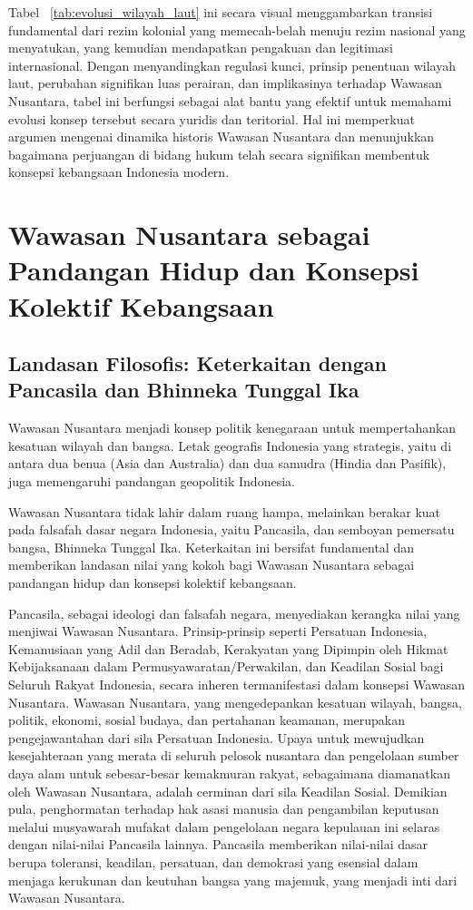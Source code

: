 \documentclass[12pt, a4paper]{article}
\begin{document}
Tabel \figurename~\ref{tab:evolusi_wilayah_laut} ini secara visual menggambarkan transisi fundamental dari rezim kolonial yang memecah-belah menuju rezim nasional yang menyatukan, yang kemudian mendapatkan pengakuan dan legitimasi internasional. Dengan menyandingkan regulasi kunci, prinsip penentuan wilayah laut, perubahan signifikan luas perairan, dan implikasinya terhadap Wawasan Nusantara, tabel ini berfungsi sebagai alat bantu yang efektif untuk memahami evolusi konsep tersebut secara yuridis dan teritorial. Hal ini memperkuat argumen mengenai dinamika historis Wawasan Nusantara dan menunjukkan bagaimana perjuangan di bidang hukum telah secara signifikan membentuk konsepsi kebangsaan Indonesia modern.
\section{Wawasan Nusantara sebagai Pandangan Hidup dan Konsepsi Kolektif Kebangsaan}
\subsection*{Landasan Filosofis: Keterkaitan dengan Pancasila dan Bhinneka Tunggal Ika}
Wawasan Nusantara menjadi konsep politik kenegaraan untuk mempertahankan kesatuan wilayah dan bangsa. Letak geografis Indonesia yang strategis, yaitu di antara dua benua (Asia dan Australia) dan dua samudra (Hindia dan Pasifik), juga memengaruhi pandangan geopolitik Indonesia.

Wawasan Nusantara tidak lahir dalam ruang hampa, melainkan berakar kuat pada falsafah dasar negara Indonesia, yaitu Pancasila, dan semboyan pemersatu bangsa, Bhinneka Tunggal Ika. Keterkaitan ini bersifat fundamental dan memberikan landasan nilai yang kokoh bagi Wawasan Nusantara sebagai pandangan hidup dan konsepsi kolektif kebangsaan.

Pancasila, sebagai ideologi dan falsafah negara, menyediakan kerangka nilai yang menjiwai Wawasan Nusantara. Prinsip-prinsip seperti Persatuan Indonesia, Kemanusiaan yang Adil dan Beradab, Kerakyatan yang Dipimpin oleh Hikmat Kebijaksanaan dalam Permusyawaratan/Perwakilan, dan Keadilan Sosial bagi Seluruh Rakyat Indonesia, secara inheren termanifestasi dalam konsepsi Wawasan Nusantara. Wawasan Nusantara, yang mengedepankan kesatuan wilayah, bangsa, politik, ekonomi, sosial budaya, dan pertahanan keamanan, merupakan pengejawantahan dari sila Persatuan Indonesia. Upaya untuk mewujudkan kesejahteraan yang merata di seluruh pelosok nusantara dan pengelolaan sumber daya alam untuk sebesar-besar kemakmuran rakyat, sebagaimana diamanatkan oleh Wawasan Nusantara, adalah cerminan dari sila Keadilan Sosial. Demikian pula, penghormatan terhadap hak asasi manusia dan pengambilan keputusan melalui musyawarah mufakat dalam pengelolaan negara kepulauan ini selaras dengan nilai-nilai Pancasila lainnya. Pancasila memberikan nilai-nilai dasar berupa toleransi, keadilan, persatuan, dan demokrasi yang esensial dalam menjaga kerukunan dan keutuhan bangsa yang majemuk, yang menjadi inti dari Wawasan Nusantara.  
\end{document}

